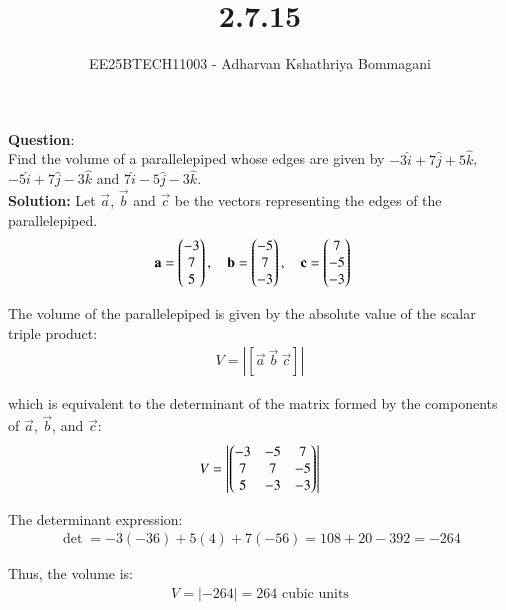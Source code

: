 \documentclass[journal]{IEEEtran}
\begin{document}


\title{2.7.15}
\author{EE25BTECH11003 - Adharvan Kshathriya Bommagani}
\maketitle


\renewcommand{\thefigure}{\theenumi}
\renewcommand{\thetable}{\theenumi}
\setlength{\intextsep}{10pt} %
\textbf{Question}:\\
Find the volume of a parallelepiped whose edges are given by $-3\hat{i} + 7\hat{j} + 5\hat{k}$, $-5\hat{i} + 7\hat{j} - 3\hat{k}$ and $7\hat{i} - 5\hat{j} - 3\hat{k}$.\\
  


\textbf{Solution:}
Let $\vec{a}$, $\vec{b}$ and $\vec{c}$ be the vectors representing the edges of the parallelepiped.
\begin{align}
\mathbf{a} &= \begin{pmatrix}-3 \\ 7 \\ 5\end{pmatrix}, \quad 
\mathbf{b} = \begin{pmatrix}-5 \\ 7 \\ -3\end{pmatrix}, \quad 
\mathbf{c} = \begin{pmatrix}7 \\ -5 \\ -3\end{pmatrix}
\end{align}



The volume of the parallelepiped is given by the absolute value of the scalar triple product:
\begin{align*}
V = \left| \left[ \vec{a} \ \vec{b} \ \vec{c} \right] \right|
\end{align*}

which is equivalent to the determinant of the matrix formed by the components of $\vec{a}$, $\vec{b}$, and $\vec{c}$:
\begin{align*}
V = \left| \begin{pmatrix} -3 & -5 & 7 \\ 7 & 7 & -5 \\ 5 & -3 & -3 \end{pmatrix} \right|
\end{align*}



The determinant expression:
\begin{align*}
\det = -3(-36) + 5(4) + 7(-56) = 108 + 20 - 392 = -264
\end{align*}

Thus, the volume is:
\begin{align*}
V = \left| -264 \right| = 264 \text{ cubic units}
\end{align*}
\end{document}
